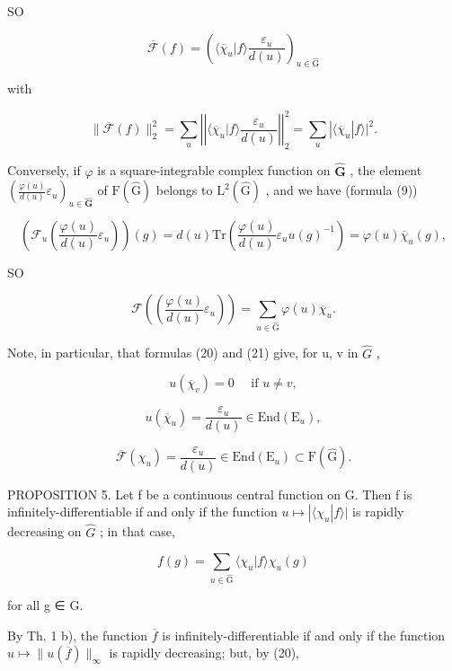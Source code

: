 SO

\[
\overline {{{{\mathcal {F}}}}} (f) = \left(\langle \overline {{{{\chi}}}} _ {u} | f \rangle \frac {\varepsilon_ {u}}{d (u)}\right) _ {u \in \hat {\mathrm{G}}}\tag{21}
\]

with

\[
\| \overline {{\mathcal {F}}} (f) \| _ {2} ^ {2} = \sum_ {u} \left| \left| \langle \overline {{\chi}} _ {u} | f \rangle \frac {\varepsilon_ {u}}{d (u)} \right| \right| _ {2} ^ {2} = \sum_ {u} | \langle \overline {{\chi}} _ {u} | f \rangle | ^ {2}.
\]

Conversely, if \(\varphi\) is a square-integrable complex function on \(\hat{\mathbf{G}}\) , the element \(\left(\frac{\varphi(u)}{d(u)}\varepsilon_u\right)_{u\in \hat{\mathbf{G}}}\) of \(\mathrm{F}(\hat{\mathrm{G}})\) belongs to \(\mathrm{L}^2 (\hat{\mathrm{G}})\) , and we have (formula (9))

\[
\left(\mathcal {F} _ {u} \left(\frac {\varphi (u)}{d (u)} \varepsilon_ {u}\right)\right) (g) = d (u) \mathrm{Tr} \left(\frac {\varphi (u)}{d (u)} \varepsilon_ {u} u (g) ^ {- 1}\right) = \varphi (u) \overline {{\chi}} _ {u} (g),
\]

SO

\[
\mathcal {F} \left(\left(\frac {\varphi (u)}{d (u)} \varepsilon_ {u}\right)\right) = \sum_ {u \in \hat {\mathrm{G}}} \varphi (u) \overline {{\chi}} _ {u}.\tag{22}
\]

Note, in particular, that formulas (20) and (21) give, for u, v in \(\hat{G}\) ,

\[
u (\overline {{\chi}} _ {v}) = 0 \quad \text { if } u \neq v,\tag{23}
\]

\[
u (\overline {{\chi}} _ {u}) = \frac {\varepsilon_ {u}}{d (u)} \in \mathrm{End} (\mathrm{E} _ {u}),\tag{24}
\]

\[
\overline {{\mathcal {F}}} (\chi_ {u}) = \frac {\varepsilon_ {u}}{d (u)} \in \mathrm{End} (\mathrm{E} _ {u}) \subset \mathrm{F} (\hat {\mathrm{G}}).\tag{25}
\]

PROPOSITION 5. Let f be a continuous central function on G. Then f is infinitely-differentiable if and only if the function \(u \mapsto |\langle \chi_{u}|f\rangle|\) is rapidly decreasing on \(\hat{G}\) ; in that case,

\[
f (g) = \sum_ {u \in \hat {\mathrm{G}}} \langle \chi_ {u} | f \rangle \chi_ {u} (g)
\]

for all g ∈ G.

By Th. 1 b), the function \(\overline{f}\) is infinitely-differentiable if and only if the function \(u \mapsto \| u(\overline{f})\|_{\infty}\) is rapidly decreasing; but, by (20),

